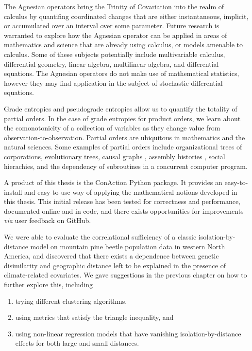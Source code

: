 \documentclass[
  letterpaper,
  DIV=11,
  numbers=noendperiod]{scrreprt}
\providecommand{\tightlist}{%
  \setlength{\itemsep}{0pt}\setlength{\parskip}{0pt}}\usepackage{longtable,booktabs,array}
\begin{document}
The Agnesian operators bring the Trinity of Covariation into the realm
of calculus by quantifing coordinated changes that are either
instantaneous, implicit, or accumulated over an interval over some
parameter. Future research is warranted to explore how the Agnesian
operator can be applied in areas of mathematics and science that are
already using calculus, or models amenable to calculus. Some of these
subjects potentially include multivariable calculus, differential
geometry, linear algebra, multilinear algebra, and differential
equations. The Agnesian operators do not make use of mathematical
statistics, however they may find application in the subject of
stochastic differential equations.

Grade entropies and pseudograde entropies allow us to quantify the
totality of partial orders. In the case of grade entropies for product
orders, we learn about the comonotonicity of a collection of variables
as they change value from observation-to-observation. Partial orders are
ubiquitous in mathematics and the natural sciences. Some examples of
partial orders include organizational trees of corporations,
evolutionary trees, causal graphs \cite{Pearl2009}, assembly histories
\cite{Marshall2021}, social hierachies, and the dependency of
subroutines in a concurrent computer program.

A product of this thesis is the ConAction Python package. It provides an
easy-to-install and easy-to-use way of applying the mathematical notions
developed in this thesis. This initial release has been tested for
correctness and performance, documented online and in code, and there
exists opportunities for improvements \textit{via} user feedback on
GitHub.

We were able to evaluate the correlational sufficiency of a classic
isolation-by-distance model on mountain pine beetle population data in
western North America, and discovered that there exists a dependence
between genetic disimilarity and geographic distance left to be
explained in the presence of climate-related covariates. We gave
suggestions in the previous chapter on how to further explore this,
including

\begin{enumerate}
\def\labelenumi{\arabic{enumi}.}
\tightlist
\item
  trying different clustering algorithms,
\item
  using metrics that satisfy the triangle inequality, and
\item
  using non-linear regression models that have vanishing
  isolation-by-distance effects for both large and small distances.
\end{enumerate}
\end{document}
